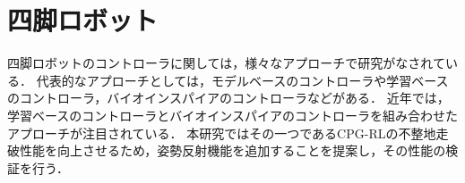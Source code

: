 \section{四脚ロボット}
四脚ロボットのコントローラに関しては，様々なアプローチで研究がなされている．
代表的なアプローチとしては，モデルベースのコントローラ\cite{MIT_Cheetah_3,kim2019highly,sombolestan2021adaptive}や学習ベースのコントローラ\cite{tan2018simtoreal,Hwangbo_2019,kumar2021rma,challenging_terrain}，バイオインスパイアのコントローラ\cite{Owaki1,Owaki2,4543306}などがある．
近年では，学習ベースのコントローラとバイオインスパイアのコントローラを組み合わせたアプローチ\cite{bellegarda2022cpgrl,cpgrl2,cpgrl3,Evolutionary}が注目されている．
本研究ではその一つであるCPG-RL\cite{bellegarda2022cpgrl}の不整地走破性能を向上させるため，姿勢反射機能を追加することを提案し，その性能の検証を行う．

